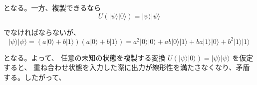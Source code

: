 \documentclass[11pt,a4paper]{ltjsarticle}
\begin{document}
となる。一方、複製できるなら
\[
U(\lvert \psi\rangle \lvert 0\rangle)=\lvert \psi\rangle\lvert \psi\rangle
\]

でなければならないが、
\[
\lvert \psi\rangle\lvert \psi\rangle
=(a\lvert 0\rangle+b\lvert 1\rangle)(a\lvert 0\rangle+b\lvert 1\rangle)
= a^2\lvert 0\rangle\lvert 0\rangle + ab\lvert 0\rangle\lvert 1\rangle + ba\lvert 1\rangle\lvert 0\rangle + b^2\lvert 1\rangle\lvert 1\rangle
\]

となる。よって、
任意の未知の状態を複製する変換 $U(\lvert \psi\rangle\lvert 0\rangle) = \lvert \psi\rangle\lvert \psi\rangle$ を仮定すると、
重ね合わせ状態を入力した際に出力が線形性を満たさなくなり、矛盾する。したがって、

\begin{center}
\end{center}
\end{document}
